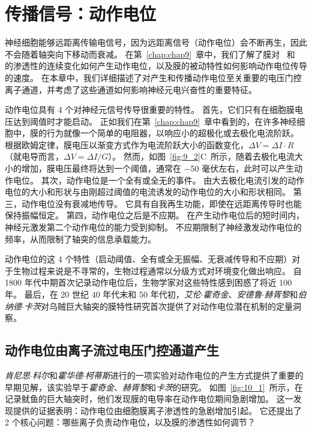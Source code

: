 \chapter{传播信号：动作电位} \label{chap:chap10}

神经细胞能够远距离传输电信号，因为远距离信号（动作电位）会不断再生，因此不会随着轴突向下移动而衰减。
在第~\ref{chap:chap9}~章中，我们了解了膜对~ 和~ 的渗透性的连续变化如何产生动作电位，以及膜的被动特性如何影响动作电位传导的速度。
在本章中，我们详细描述了对产生和传播动作电位至关重要的电压门控离子通道，并考虑了这些通道如何影响神经元电兴奋性的重要特征。


动作电位具有 4 个对神经元信号传导很重要的特性。
首先，它们只有在细胞膜电压达到阈值时才能启动。
正如我们在第~\ref{chap:chap9}~章中看到的，在许多神经细胞中，膜的行为就像一个简单的电阻器，以响应小的超极化或去极化电流阶跃。
根据欧姆定律，膜电压以渐变方式作为电流阶跃大小的函数变化，$\Delta V = \Delta I \cdot R$（就电导而言，$\Delta V = \Delta I / G$）。
然而，如图~\ref{fig:9_2}C~所示，随着去极化电流大小的增加，膜电压最终将达到一个阈值，通常在 −50 毫伏左右，此时可以产生动作电位。
其次，动作电位是一个全有或全无的事件。
由大去极化电流引发的动作电位的大小和形状与由刚超过阈值的电流诱发的动作电位的大小和形状相同。
第三，动作电位没有衰减地传导。
它具有自我再生功能，即使在远距离传导时也能保持振幅恒定。
第四，动作电位之后是不应期。
在产生动作电位后的短时间内，神经元激发第二个动作电位的能力受到抑制。
不应期限制了神经激发动作电位的频率，从而限制了轴突的信息承载能力。


动作电位的这 4 个特性（启动阈值、全有或全无振幅、无衰减传导和不应期）对于生物过程来说是不寻常的，生物过程通常以分级方式对环境变化做出响应。
自 1800 年代中期首次记录动作电位后，生物学家对这些特性感到困惑了将近 100 年。
最后，在 20 世纪 40 年代末和 50 年代初，\textit{艾伦$\cdot$霍奇金}、\textit{安德鲁$\cdot$赫胥黎}和\textit{伯纳德$\cdot$卡茨}对乌贼巨大轴突的膜特性研究首次提供了对动作电位潜在机制的定量洞察。



\section{动作电位由离子流过电压门控通道产生}

\textit{肯尼思$\cdot$科尔}和\textit{霍华德$\cdot$柯蒂斯}进行的一项实验对动作电位的产生方式提供了重要的早期见解，该实验早于\textit{霍奇金}、\textit{赫胥黎}和\textit{卡茨}的研究。
如图~\ref{fig:10_1}~所示，在记录鱿鱼的巨大轴突时，他们发现膜的电导率在动作电位期间急剧增加。
这一发现提供的证据表明：动作电位由细胞膜离子渗透性的急剧增加引起。
它还提出了 2 个核心问题：哪些离子负责动作电位，以及膜的渗透性如何调节？


